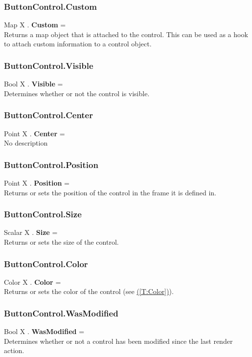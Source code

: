 \documentclass[10pt]{book}
\newcommand{\linkitem}[1]{\hyperref[#1]{\nameref{#1} (\ref{#1})}}
\begin{document}
\subsubsection{ButtonControl.Custom \label{F:ButtonControl:Custom}}
Map X . \textbf{Custom} = \\
Returns a map object that is attached to the control. This can be used as a hook to attach custom information to a control object.

\subsubsection{ButtonControl.Visible \label{F:ButtonControl:Visible}}
Bool X . \textbf{Visible} = \\
Determines whether or not the control is visible.

\subsubsection{ButtonControl.Center \label{F:ButtonControl:Center}}
Point X . \textbf{Center} = \\
No description

\subsubsection{ButtonControl.Position \label{F:ButtonControl:Position}}
Point X . \textbf{Position} = \\
Returns or sets the position of the control in the frame it is defined in.

\subsubsection{ButtonControl.Size \label{F:ButtonControl:Size}}
Scalar X . \textbf{Size} = \\
Returns or sets the size of the control.

\subsubsection{ButtonControl.Color \label{F:ButtonControl:Color}}
Color X . \textbf{Color} = \\
Returns or sets the color of the control (see \linkitem{T:Color}).

\subsubsection{ButtonControl.WasModified \label{F:ButtonControl:WasModified}}
Bool X . \textbf{WasModified} = \\
Determines whether or not a control has been modified since the last render action.
\end{document}
